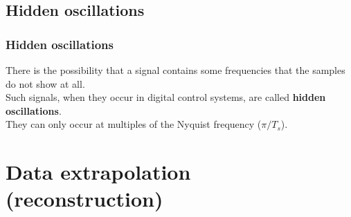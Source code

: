 \subsection{Hidden oscillations}

\begin{frame}
	\frametitle{Hidden oscillations}
	\begin{definition}
	There is the possibility that a signal contains some frequencies that the samples do not show at all. \\
	\vspace{1em}
	Such signals, when they occur in digital control systems, are called \textbf{hidden oscillations}.\\
	\vspace{1em}
	They can only occur at multiples of the Nyquist frequency ($\pi/T_s$).
	\end{definition}
\end{frame}

\section{Data extrapolation (reconstruction)}

